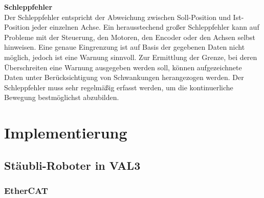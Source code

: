 \documentclass[ a4paper,
                oneside,
                toc=bibliography,
                toc=listof
                ]{scrbook}
\begin{document}
 	\textbf{Schleppfehler}\\
 	Der Schleppfehler entspricht der Abweichung zwischen Soll-Position und Ist-Position jeder einzelnen Achse. Ein herausstechend großer Schleppfehler kann auf Probleme mit der Steuerung, den Motoren, den Encoder oder den Achsen selbst hinweisen. Eine genaue Eingrenzung ist auf Basis der gegebenen Daten nicht möglich, jedoch ist eine Warnung sinnvoll. Zur Ermittlung der Grenze, bei deren Überschreiten eine Warnung ausgegeben werden soll, können aufgezeichnete Daten unter Berücksichtigung von Schwankungen herangezogen werden. Der Schleppfehler muss sehr regelmäßig erfasst werden, um die kontinuerliche Bewegung bestmöglichst abzubilden. 
	
	\newpage
	\chapter{Implementierung}
	
	\section{Stäubli-Roboter in VAL3}
	
	\subsection{EtherCAT}
	
\end{document}
